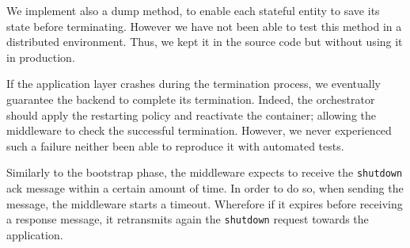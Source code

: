 We implement also a dump method, to enable each stateful entity to save its
state before terminating. However we have not
been able to test this method in a distributed environment. Thus, we
kept it in the source code but without using it in production.


If the application layer crashes during the termination process, we eventually
guarantee the backend to complete its termination. Indeed, the
orchestrator should apply the restarting policy and reactivate the container;
allowing the middleware to check the successful termination.
However, we never experienced
such a failure neither been able to reproduce it with automated tests.


Similarly to the bootstrap phase, the middleware expects to receive the
\verb|shutdown| ack message within a certain amount of time.
In order to do so, when sending the message, the middleware starts a timeout.
Wherefore if it expires before receiving a response message,
it retransmits again the \verb|shutdown| request towards the application.
